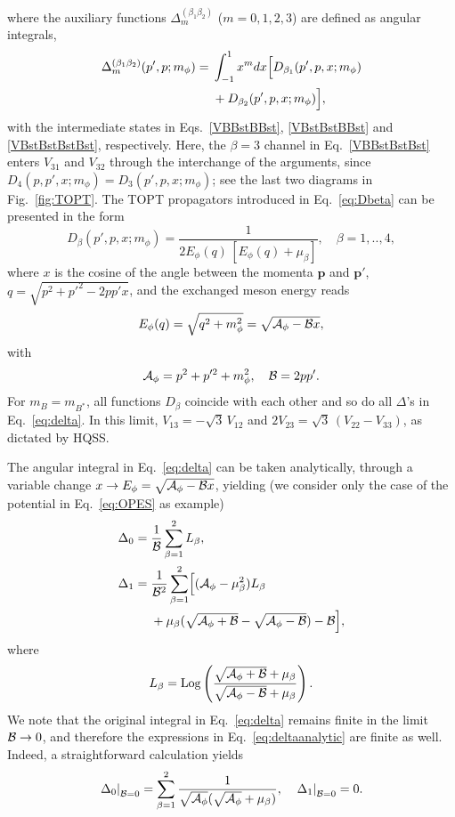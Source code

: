 \documentclass[aps,prd,showpacs,amsmath,twocolumn,superscriptaddress,floatfix,nofootinbib,notitlepage]{revtex4-2}
\newcommand{\vep}{{\bm p}}
\newcommand{\be}{\begin{equation}}
\newcommand{\ee}{\end{equation}}
\newcommand{\mG}{m_\phi}
\newcommand{\EG}{E_\phi}
\begin{document}
where the auxiliary functions $\Delta_m^{(\beta_1\beta_2)}$ ($m=0,1,2,3$) are defined as angular integrals, 
\begin{align}
\Delta^{(\beta_1\beta_2)}_m(p',p;\mG) ={}& \int_{-1}^1 x^mdx\Bigl[
D_{\beta_1}(p',p,x;\mG)\notag\\
&+D_{\beta_2}(p',p,x;\mG)\Bigr],
\label{eq:delta}
\end{align}
with the intermediate states in Eqs.~\eqref{VBBstBBst}, \eqref{VBstBstBBst} and \eqref{VBstBstBstBst}, respectively. Here, the $\beta=3$ channel in Eq.~\eqref{VBBstBstBst} enters $V_{31}$ and $V_{32}$ through the interchange of the arguments, since $D_4(p,p',x;\mG)=D_3(p',p,x;\mG)$; see the last two diagrams in Fig.~\ref{fig:TOPT}. 
The TOPT propagators introduced in Eq.~\eqref{eq:Dbeta} can be presented in the form
\be
D_\beta(p',p,x;\mG)=\frac1{2\EG(q)\,[\EG (q)+\mu_\beta]},\quad \beta=1,..,4,
\label{eq:Dabapp}
\ee
where $x$ is the cosine of the angle between the momenta $\vep$ and $\vep'$, $q=\sqrt{p^2+p'^2-2pp'x}$, and the exchanged meson energy reads
\be
\EG(q)=\sqrt{q^2+\mG^2}=\sqrt{{\cal A}_\phi-{\cal B}x},
\label{EGdef}
\ee
with
\be
{\cal A}_\phi=p^2+p^{\prime2}+m_\phi^2,\quad
{\cal B}=2pp'.
\ee
For $m_B=m_{B^*}$, all functions $D_\beta$ coincide with each other and so do all $\Delta$'s in Eq.~\eqref{eq:delta}. In this limit, $V_{13}=-\sqrt3\,V_{12}$ and $2V_{23}=\sqrt3\,(V_{22}-V_{33})$, as dictated by HQSS.

The angular integral in Eq.~\eqref{eq:delta} can be taken analytically, through a variable change $x\to\EG=\sqrt{{\cal A}_\phi-{\cal B}x}$, yielding (we consider only the case of the potential in Eq.~\eqref{eq:OPES} as example)
\be
\begin{split}
\Delta_0={}&\frac{1}{{\cal B}}\sum_{\beta=1}^2 L_\beta,\\
\Delta_1={}&\frac{1}{{\cal B}^2}\sum_{\beta=1}^2
\Bigl[({\cal A}_\phi-\mu_\beta^2)L_\beta\\
&+\mu_\beta
(\sqrt{{\cal A}_\phi+{\cal B}}-\sqrt{{\cal A}_\phi-{\cal B}})-{\cal B}\Bigr],
\end{split}
\label{eq:deltaanalytic}
\ee
where
\be
L_\beta=\operatorname{Log}\left(\frac{\sqrt{{\cal A}_\phi+{\cal B}}+\mu_\beta}{\sqrt{{\cal A}_\phi-{\cal B}}+\mu_\beta}\right).
\label{eq:OMEaux}
\ee
We note that the original integral in Eq.~\eqref{eq:delta} remains finite in the limit ${\cal B}\to 0$, and therefore the expressions in Eq.~\eqref{eq:deltaanalytic} are finite as well. Indeed, a straightforward calculation yields
\be
\left.\Delta_0\right|_{{\cal B}=0}
=\sum_{\beta=1}^2\frac{1}{\sqrt{{\cal A}_\phi}(\sqrt{{\cal A}_\phi}+\mu_\beta)},\quad
\left.\Delta_1\right|_{{\cal B}=0}=0.
\label{eq:deltazeroB}
\ee
\end{document}
